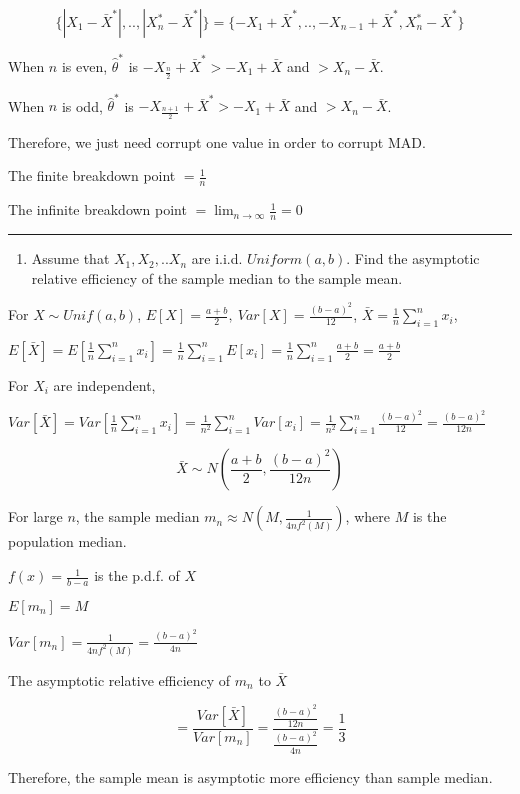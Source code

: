 \documentclass[12pt,]{article}
\providecommand{\tightlist}{%
  \setlength{\itemsep}{0pt}\setlength{\parskip}{0pt}}
\begin{document}
\[\{|X_1-\bar X^*|,..,|X_n^*-\bar X^*|\}=\{-X_1+\bar X^*,..,-X_{n-1}+\bar X^*,X_n^*-\bar X^*\}\]

When \(n\) is even, \(\hat\theta^*\) is
\(-X_{\frac{n}2}+\bar X^*>-X_1+\bar X\) and \(>X_n-\bar X\).

When \(n\) is odd, \(\hat\theta^*\) is
\(-X_{\frac{n+1}2}+\bar X^*>-X_1+\bar X\) and \(>X_n-\bar X\).

Therefore, we just need corrupt one value in order to corrupt MAD.

The finite breakdown point \(=\frac{1}{n}\)

The infinite breakdown point \(=\lim_{n\to\infty}\frac1n=0\)

\begin{center}\rule{0.5\linewidth}{\linethickness}\end{center}

\begin{enumerate}
\def\labelenumi{\arabic{enumi}.}
\setcounter{enumi}{3}
\tightlist
\item
  Assume that \(X_1,X_2,..X_{n}\) are i.i.d. \(Uniform(a,b)\). Find the
  asymptotic relative efficiency of the sample median to the sample
  mean.
\end{enumerate}

For \(X\sim Unif(a,b)\),
\(E[X]=\frac{a+b}2,\ Var[X]=\frac{(b-a)^2}{12}\),
\(\bar X=\frac1n\sum_{i=1}^nx_i\),

\(E[\bar X]=E[\frac1n\sum_{i=1}^nx_i]=\frac1n\sum_{i=1}^nE[x_i]=\frac1n\sum_{i=1}^n\frac{a+b}2=\frac{a+b}2\)

For \(X_i\) are independent,

\(Var[\bar X]=Var[\frac1n\sum_{i=1}^nx_i]=\frac1{n^2}\sum_{i=1}^nVar[x_i]=\frac1{n^2}\sum_{i=1}^n\frac{(b-a)^2}{12}=\frac{(b-a)^2}{12n}\)

\[\bar X\sim N(\frac{a+b}2,\frac{(b-a)^2}{12n})\]

For large \(n\), the sample median
\(m_n\approx N(M, \frac{1}{4nf^2(M)})\), where \(M\) is the population
median.

\(f(x)=\frac{1}{b-a}\) is the p.d.f. of \(X\)

\(E[m_n]=M\)

\(Var[m_n]=\frac{1}{4nf^2(M)}=\frac{(b-a)^2}{4n}\)

The asymptotic relative efficiency of \(m_n\) to \(\bar X\)

\[=\frac{Var[\bar X]}{Var[m_n]}=\frac{\frac{(b-a)^2}{12n}}{\frac{(b-a)^2}{4n}}=\frac13\]

Therefore, the sample mean is asymptotic more efficiency than sample
median.
\end{document}
